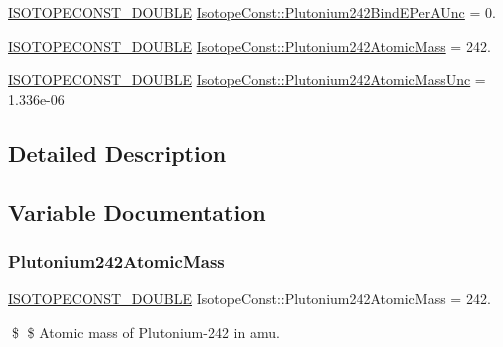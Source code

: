 \begin{DoxyCompactItemize}
\mbox{\hyperlink{group___isotope_const-_macros_ga8f45a7272ce02c0b4c65c44636ed719a}{I\+S\+O\+T\+O\+P\+E\+C\+O\+N\+S\+T\+\_\+\+D\+O\+U\+B\+LE}} \mbox{\hyperlink{group___isotope_const-_plutonium-_pu242_ga4e05e4a6b464da046cab267c121c73f5}{Isotope\+Const\+::\+Plutonium242\+Bind\+E\+Per\+A\+Unc}} = 0.
\item 
\mbox{\hyperlink{group___isotope_const-_macros_ga8f45a7272ce02c0b4c65c44636ed719a}{I\+S\+O\+T\+O\+P\+E\+C\+O\+N\+S\+T\+\_\+\+D\+O\+U\+B\+LE}} \mbox{\hyperlink{group___isotope_const-_plutonium-_pu242_ga10dce67b5c790bd8e491fd271c9202f1}{Isotope\+Const\+::\+Plutonium242\+Atomic\+Mass}} = 242.
\item 
\mbox{\hyperlink{group___isotope_const-_macros_ga8f45a7272ce02c0b4c65c44636ed719a}{I\+S\+O\+T\+O\+P\+E\+C\+O\+N\+S\+T\+\_\+\+D\+O\+U\+B\+LE}} \mbox{\hyperlink{group___isotope_const-_plutonium-_pu242_ga6073f6dbcb8ce3e2caa4fedc34cd6be1}{Isotope\+Const\+::\+Plutonium242\+Atomic\+Mass\+Unc}} = 1.\+336e-\/06
\end{DoxyCompactItemize}


\subsection{Detailed Description}


\subsection{Variable Documentation}
\mbox{\label{group___isotope_const-_plutonium-_pu242_ga10dce67b5c790bd8e491fd271c9202f1}} 
\subsubsection{\texorpdfstring{Plutonium242\+Atomic\+Mass}{Plutonium242AtomicMass}}
{\footnotesize\ttfamily \mbox{\hyperlink{group___isotope_const-_macros_ga8f45a7272ce02c0b4c65c44636ed719a}{I\+S\+O\+T\+O\+P\+E\+C\+O\+N\+S\+T\+\_\+\+D\+O\+U\+B\+LE}} Isotope\+Const\+::\+Plutonium242\+Atomic\+Mass = 242.}

\$ \$ Atomic mass of Plutonium-\/242 in amu. \mbox{\label{group___isotope_const-_plutonium-_pu242_ga6073f6dbcb8ce3e2caa4fedc34cd6be1}} 
